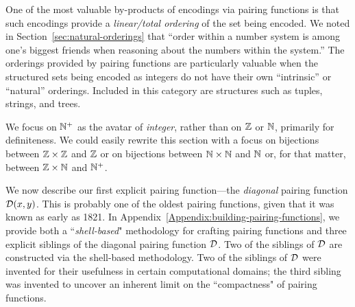 \medskip


One of the most valuable by-products of encodings via pairing functions is that such encodings provide a {\em linear/total ordering} of the set being encoded.  We noted in Section~\ref{sec:natural-orderings} that ``order within a number system is among one's biggest friends when reasoning about the numbers within the system.''  The orderings provided by pairing functions are particularly valuable when the structured sets being encoded as integers do not have their own ``intrinsic'' or ``natural'' orderings.  Included in this category are structures such as tuples, strings, and trees.

\bigskip

\noindent {}
\bigskip

We focus on $\mathbb{N}^+$ as the avatar of {\it integer}, rather than on $\mathbb{Z}$ or $\mathbb{N}$, primarily for definiteness.  We could easily rewrite this section with a focus on bijections between $\mathbb{Z} \times \mathbb{Z}$ and $\mathbb{Z}$ or on bijections between $\mathbb{N} \times \mathbb{N}$ and $\mathbb{N}$ or, for that matter, between $\mathbb{Z} \times \mathbb{N}$ and $\mathbb{N}^+$.

\bigskip

We now describe our first explicit pairing function---the {\em diagonal} pairing function $\mbox{$\cal D$}(x,y)$.  This is probably one of the oldest pairing functions, given that it was known as early as 1821.   In Appendix~\ref{Appendix:building-pairing-functions}, we provide both a ``{\em shell-based}" methodology for crafting pairing functions and three explicit siblings of the diagonal pairing function $\mbox{$\cal D$}$.  Two of the siblings of $\mbox{$\cal D$}$ are constructed via the shell-based methodology.  Two of the siblings of $\mbox{$\cal D$}$ were invented for their usefulness in certain computational domains; the third sibling was invented to uncover an inherent limit on the ``compactness" of pairing functions.


